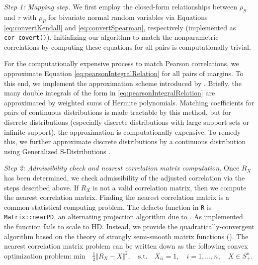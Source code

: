 \documentclass[
]{jss}
\begin{document}
\emph{Step 1: Mapping step.} We first employ the closed-form relationships between \(\rho_S\) and \(\tau\) with \(\rho_P\) for bivariate normal random variables via Equations \eqref{eq:convertKendall} and \eqref{eq:convertSpearman}, respectively (implemented as \texttt{cor\_covert()}). Initializing our algorithm to match the nonparametric correlations by computing these equations for all pairs is computationally trivial.

For the computationally expensive process to match Pearson correlations, we approximate Equation \eqref{eq:pearsonIntegralRelation} for all pairs of margins. To this end, we implement the approximation scheme introduced by \citet{XZ19}. Briefly, the many double integrals of the form in \eqref{eq:pearsonIntegralRelation} are approximated by weighted sums of Hermite polynomials. Matching coefficients for pairs of continuous distributions is made tractable by this method, but for discrete distributions (especially discrete distributions with large support sets or infinite support), the approximation is computationally expensive. To remedy this, we further approximate discrete distributions by a continuous distribution using Generalized S-Distributions \citep{muino2006gs}.

\emph{Step 2: Admissibility check and nearest correlation matrix computation.} Once \(R_X\) has been determined, we check admissibility of the adjusted correlation via the steps described above. If \(R_X\) is not a valid correlation matrix, then we compute the nearest correlation matrix. Finding the nearest correlation matrix is a common statistical computing problem. The defacto function in \texttt{R} is \texttt{Matrix::nearPD}, an alternating projection algorithm due to \citet{higham2002computing}. As implemented the function fails to scale to HD. Instead, we provide the quadratically-convergent algorithm based on the theory of strongly semi-smooth matrix functions (\citet{qi2006quadratically}). The nearest correlation matrix problem can be written down as the following convex optimization problem: \(\mathrm{min} \quad \frac{1}{2} \Vert R_X - X \Vert^2, \quad \mathrm{s.t.} \quad X_{ii} = 1, \quad i = 1, \ldots , n, \quad X \in S_{+}^{n}\).
\end{document}
